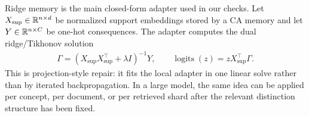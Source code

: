 Ridge memory is the main closed-form adapter used in our checks. Let $X_{\mathrm{sup}}\in\mathbb{R}^{n\times d}$ be normalized support embeddings stored by a CA memory and let $Y\in\mathbb{R}^{n\times C}$ be one-hot consequences. The adapter computes the dual ridge/Tikhonov solution \citep{tikhonov1977solutions,hoerl1970ridge}
\begin{align*}
\Gamma=(X_{\mathrm{sup}}X_{\mathrm{sup}}^\top+\lambda I)^{-1}Y,
\qquad
\operatorname{logits}(z)=zX_{\mathrm{sup}}^\top\Gamma.
\end{align*}
This is projection-style repair: it fits the local adapter in one linear solve rather than by iterated backpropagation. In a large model, the same idea can be applied per concept, per document, or per retrieved shard after the relevant distinction structure has been fixed.
